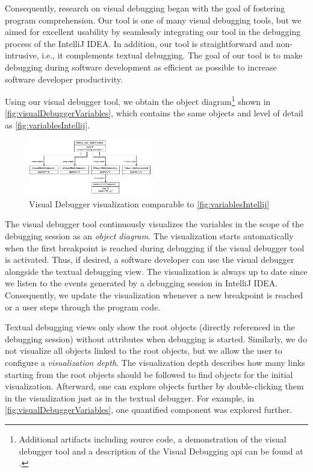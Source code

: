 \documentclass[conference]{IEEEtran}
\newcommand{\intellij}{IntelliJ IDEA}
\begin{document}
Consequently, research on visual debugging began with the goal of fostering program comprehension.
Our tool is one of many visual debugging tools, but we aimed for excellent usability by seamlessly integrating our tool in the debugging process of the \intellij{}.
In addition, our tool is straightforward and non-intrusive, i.e., it complements textual debugging.
The goal of our tool is to make debugging during software development as efficient as possible to increase software developer productivity.

Using our visual debugger tool, we obtain the object diagram\footnote{\label{footnote:artifacts} Additional artifacts including source code, a demonstration of the visual debugger tool and a description of the Visual Debugging \acrshort*{api} can be found at \cite{ArtifactsICSME2022}.} shown in \autoref{fig:visualDebuggerVariables}, which contains the same objects and level of detail as \autoref{fig:variablesIntellij}.

\begin{figure}[h]
    \centering
    \includegraphics[width=0.48\textwidth]{images/VD-partsList-objects.pdf}
    \caption{Visual Debugger visualization comparable to \autoref{fig:variablesIntellij}}
    \label{fig:visualDebuggerVariables}
\end{figure}

The visual debugger tool continuously visualizes the variables in the scope of the debugging session as an \textit{object diagram}.
The visualization starts automatically when the first breakpoint is reached during debugging if the visual debugger tool is activated.
Thus, if desired, a software developer can use the visual debugger alongside the textual debugging view.
The visualization is always up to date since we listen to the events generated by a debugging session in \intellij{}.
Consequently, we update the visualization whenever a new breakpoint is reached or a user steps through the program code.

Textual debugging views only show the root objects (directly referenced in the debugging session) without attributes when debugging is started.
Similarly, we do not visualize all objects linked to the root objects, but we allow the user to configure a \textit{visualization depth}.
The visualization depth describes how many links starting from the root objects should be followed to find objects for the initial visualization.
Afterward, one can explore objects further by double-clicking them in the visualization just as in the textual debugger.
For example, in \autoref{fig:visualDebuggerVariables}, one quantified component was explored further.
\end{document}
